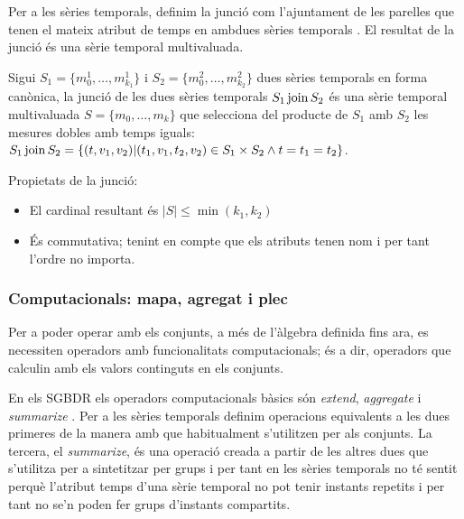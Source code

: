 Per a les sèries temporals, definim la junció com l'ajuntament de les
parelles que tenen el mateix atribut de temps en ambdues sèries
temporals . El resultat de la junció és una sèrie temporal
multivaluada.
\begin{definition}[junció]\label{def:sgst:join}
  Sigui $S_1=\{m_0^1, \dotsc, m_{k_1}^1\}$ i $S_2=\{m_0^2, \dotsc,
  m_{k_2}^2\}$ dues sèries temporals en forma canònica, la junció de
  les dues sèries temporals $S_1 \operatorname*{join} S_2$ és una sèrie temporal
  multivaluada $S=\{m_0, \dotsc, m_k\}$ que selecciona del producte de
  $S_1$ amb $S_2$ les mesures dobles amb temps iguals: $S_1 \operatorname*{join} S_2
  = \{ (t,v_1,v_2) | (t_1,v_1,t_2,v_2) \in S_1\times S_2 \wedge
  t=t_1=t_2 \}$.
\end{definition}


Propietats de la junció:
\begin{itemize}
\item El cardinal resultant és $|S|\leq\min(k_1,k_2)$
\item És commutativa; tenint en compte que els atributs tenen nom i
  per tant l'ordre no importa.
\end{itemize}







\subsubsection{Computacionals: mapa, agregat i plec}

Per a poder operar amb els conjunts, a més de l'àlgebra definida fins
ara, es necessiten operadors amb funcionalitats computacionals; és a
dir, operadors que calculin amb els valors continguts en els conjunts. 

En els SGBDR els operadors computacionals bàsics són \emph{extend},
\emph{aggregate} i \emph{summarize} \parencite{date:introduction}.
Per a les sèries temporals definim operacions equivalents a les dues
primeres de la manera amb que habitualment s'utilitzen per als
conjunts. La tercera, el \emph{summarize}, és una operació creada a
partir de les altres dues que s'utilitza per a sintetitzar per grups i
per tant en les sèries temporals no té sentit perquè l'atribut temps
d'una sèrie temporal no pot tenir instants repetits i per tant no se'n
poden fer grups d'instants compartits. 

